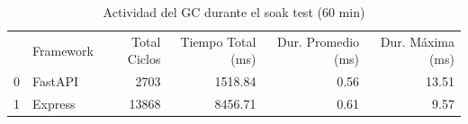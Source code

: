 \begin{table}
\caption{Actividad del GC durante el soak test (60 min)}
\label{tab:soak_gc}
\begin{tabular}{llrrrr}
 & Framework & Total Ciclos & Tiempo Total (ms) & Dur. Promedio (ms) & Dur. Máxima (ms) \\
0 & FastAPI & 2703 & 1518.84 & 0.56 & 13.51 \\
1 & Express & 13868 & 8456.71 & 0.61 & 9.57 \\
\end{tabular}
\end{table}
